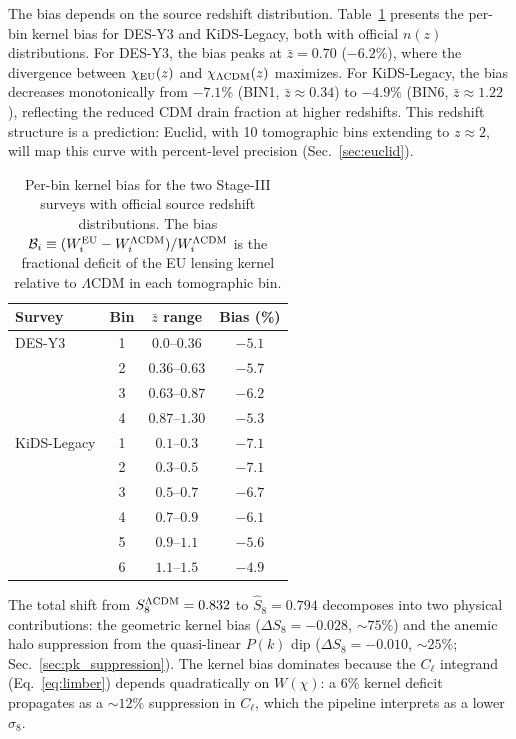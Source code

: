 \documentclass[a4paper,fleqn]{cas-dc}
\begin{document}
The bias depends on the source redshift distribution.
Table~\ref{tab:kernel_bias} presents the per-bin kernel
bias for DES-Y3 and KiDS-Legacy, both with official
$n(z)$ distributions. For DES-Y3, the bias peaks at
$\bar{z} = 0.70$ ($-6.2\%$), where the divergence between
$\chi_{\rm EU}(z)$ and $\chi_{\Lambda{\rm CDM}}(z)$
maximizes. For KiDS-Legacy, the bias decreases
monotonically from $-7.1\%$ (BIN1, $\bar{z} \approx 0.34$)
to $-4.9\%$ (BIN6, $\bar{z} \approx 1.22$), reflecting
the reduced CDM drain fraction at higher redshifts.
This redshift structure is a prediction: Euclid, with 10
tomographic bins extending to $z \approx 2$, will map
this curve with percent-level precision
(Sec.~\ref{sec:euclid}).

\begin{table}[t]
\caption{Per-bin kernel bias for the two Stage-III surveys
with official source redshift distributions. The bias
$\mathcal{B}_i \equiv (W_i^{\rm EU} - W_i^{\Lambda{\rm CDM}})
/ W_i^{\Lambda{\rm CDM}}$ is the fractional deficit of the
EU lensing kernel relative to $\Lambda$CDM in each
tomographic bin.}
\label{tab:kernel_bias}
\begin{tabular}{lccc}
Survey & Bin & $\bar{z}$ range & Bias (\%) \\
\hline
DES-Y3 & 1 & $0.0$--$0.36$ & $-5.1$ \\
        & 2 & $0.36$--$0.63$ & $-5.7$ \\
        & 3 & $0.63$--$0.87$ & $-6.2$ \\
        & 4 & $0.87$--$1.30$ & $-5.3$ \\
\hline
KiDS-Legacy & 1 & $0.1$--$0.3$ & $-7.1$ \\
            & 2 & $0.3$--$0.5$ & $-7.1$ \\
            & 3 & $0.5$--$0.7$ & $-6.7$ \\
            & 4 & $0.7$--$0.9$ & $-6.1$ \\
            & 5 & $0.9$--$1.1$ & $-5.6$ \\
            & 6 & $1.1$--$1.5$ & $-4.9$ \\
\end{tabular}
\end{table}

The total shift from $S_8^{\Lambda\rm CDM} = 0.832$ to
$\hat{S}_8 = 0.794$ decomposes into two physical
contributions: the geometric kernel bias
($\Delta S_8 = -0.028$, $\sim\!75\%$) and the anemic halo
suppression from the quasi-linear $P(k)$ dip
($\Delta S_8 = -0.010$, $\sim\!25\%$;
Sec.~\ref{sec:pk_suppression}). The kernel bias dominates
because the $C_\ell$ integrand
(Eq.~\ref{eq:limber}) depends quadratically on $W(\chi)$:
a $6\%$ kernel deficit propagates as a $\sim\!12\%$
suppression in $C_\ell$, which the pipeline interprets
as a lower $\sigma_8$.
\end{document}
